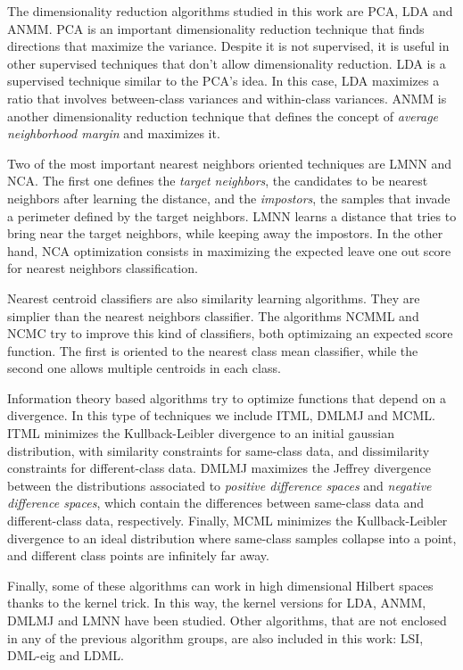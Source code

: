 The dimensionality reduction algorithms studied in this work are PCA, LDA and ANMM. PCA is an important dimensionality reduction technique that finds directions that maximize the variance. Despite it is not supervised, it is useful in other supervised techniques that don't allow dimensionality reduction. LDA is a supervised technique similar to the PCA's idea. In this case, LDA maximizes a ratio that involves between-class variances and within-class variances. ANMM is another dimensionality reduction technique that defines the concept of \emph{average neighborhood margin} and maximizes it.

Two of the most important nearest neighbors oriented techniques are LMNN and NCA. The first one defines the \emph{target neighbors}, the candidates to be nearest neighbors after learning the distance, and the \emph{impostors}, the samples that invade a perimeter defined by the target neighbors. LMNN learns a distance that tries to bring near the target neighbors, while keeping away the impostors. In the other hand, NCA optimization consists in maximizing the expected leave one out score for nearest neighbors classification.

Nearest centroid classifiers are also similarity learning algorithms. They are simplier than the nearest neighbors classifier. The algorithms NCMML and NCMC try to improve this kind of classifiers, both optimizaing an expected score function. The first is oriented to the nearest class mean classifier, while the second one allows multiple centroids in each class.

Information theory based algorithms try to optimize functions that depend on a divergence. In this type of techniques we include ITML, DMLMJ and MCML. ITML minimizes the Kullback-Leibler divergence to an initial gaussian distribution, with similarity constraints for same-class data, and dissimilarity constraints for different-class data. DMLMJ maximizes the Jeffrey divergence between the distributions associated to \emph{positive difference spaces} and \emph{negative difference spaces}, which contain the differences between same-class data and different-class data, respectively. Finally, MCML minimizes the Kullback-Leibler divergence to an ideal distribution where same-class samples collapse into a point, and different class points are infinitely far away.

Finally, some of these algorithms can work in high dimensional Hilbert spaces thanks to the kernel trick. In this way, the kernel versions for LDA, ANMM, DMLMJ and LMNN have been studied. Other algorithms, that are not enclosed in any of the previous algorithm groups, are also included in this work: LSI, DML-eig and LDML.


